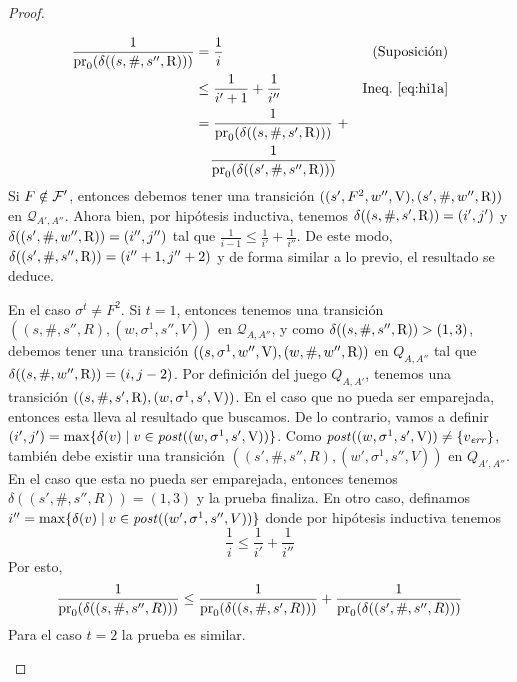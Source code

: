 \begin{proof}
\begin{description}
\begin{align*}
	\frac{1}{\pr{0}{\delta((s,\#, s'', \Refuter))}} & = \frac{1}{i} & \text{(Suposición)} \\
									      & \leq \frac{1}{i'+1} + \frac{1}{i''} & \text{Ineq.~\ref{eq:hi1a}} \\
									      &  = \frac{1}{\pr{0}{\delta((s, \#, s', \Refuter))}} \ +  \\ &\phantom{=\ } \frac{1}{\pr{0}{\delta((s', \#, s'', \Refuter))}} &
\end{align*}
	Si $F \notin \mathcal{F}'$, entonces debemos tener una transición $((s', F^2, w'', \mathrm{V}), (s', \#, w'', \mathrm{R}))$ en $\mathcal{Q}_{A',A''}$. 
Ahora bien, por hipótesis inductiva, tenemos $\delta((s, \#, s', \mathrm{R})) = (i',j')$ y $\delta((s', \#, w'', \mathrm{R})) = (i'',j'')$ tal que 
$\frac{1}{i-1} \leq \frac{1}{i'} + \frac{1}{i''}$. De este modo, $\delta((s', \#, s'', \mathrm{R})) = (i''+1, j''+2)$ y de forma similar a lo previo, el resultado se deduce.

	En el caso $\sigma^t \neq F^2$. Si $t=1$, entonces tenemos una transición $((s, \#, s'', R), (w, \sigma^1, s'', V))$ en $\mathcal{Q}_{A,A''}$, y 
	como $\delta((s, \#, s'', \mathrm{R})) > (1,3)$,
debemos tener una transición $((s, \sigma^1, w'', \mathrm{V}), (w, \#, w'', \mathrm{R}))$ en $Q_{A,A''}$ tal que $\delta((s, \#, w'', \mathrm{R})) = (i,j-2)$. 
Por definición del juego $Q_{A, A'}$, tenemos una transición
$((s, \#, s', \mathrm{R}), (w, \sigma^1, s', \mathrm{V}))$. En el caso que no pueda ser emparejada, entonces esta lleva al resultado que buscamos. De lo contrario, vamos a definir $(i',j') = \max \{\delta(v) \mid v \in \mathit{post}((w, \sigma^1, s', \mathrm{V})) \}$. 
Como $\mathit{post}((w, \sigma^1, s', \mathrm{V})) \neq \{v_{\mathit{err}}\}$, también debe existir una transición $((s', \#, s'', R), (w', \sigma^1, s'', V))$ en $Q_{A',A''}$. 
En el caso que esta no pueda ser emparejada, entonces tenemos $\delta((s', \#, s'', R)) = (1,3)$ y la prueba finaliza. 
En otro caso, definamos $i'' = \max \{\delta(v) \mid v \in \mathit{post}((w', \sigma^1, s'', V)) \}$ donde por hipótesis inductiva tenemos
\begin{equation}
	\frac{1}{i} \leq \frac{1}{i'} + \frac{1}{i''}
\end{equation}	
	Por esto, 
\begin{equation}
	\frac{1}{\operatorname{pr}_{0}(\delta((s, \#, s'', R)))} \leq \frac{1}{\operatorname{pr}_{0}(\delta((s, \#, s', R)))} + \frac{1}{\operatorname{pr}_{0}(\delta((s', \#, s'', R)))}
\end{equation}	
	Para el caso $t=2$ la prueba es similar.
\end{description}


\qedhere
\end{proof}\\

